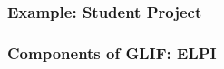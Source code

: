 \begin{frame}
    \frametitle{Example: Student Project \cite{intensional-glif:github}}
\end{frame}


\begin{frame}
    \frametitle{Components of GLIF: ELPI}
    \autowidth{
    
    }
\end{frame}

